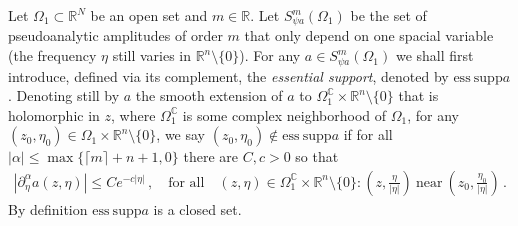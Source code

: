 \documentclass[
	fontsize=11pt, 
	twoside=false, 
	abstract=true, 
	a4paper,
]{scrartcl}
\newcommand{\sem}{\setminus\{0\}}
\newcommand{\RR}{\mathbb{R}}
\newcommand{\CC}{\mathbb{C}}
\newcommand{\abs}[1]{\left\lvert#1\right\rvert}
\newcommand{\del}{\partial}
\newcommand{\es}{\mathrm{ess}\ \mathrm{supp}}
\begin{document}
Let $\Omega_1\subset \RR^N$ be an open set and $m\in\RR$. Let $S^m_{\psi a}(\Omega_1)$ be the set of pseudoanalytic amplitudes of order $m$ that only depend on one spacial variable (the frequency $\eta$ still varies in $\RR^n\sem$). For any $a\in S^m_{\psi a}(\Omega_1)$ we shall first introduce, defined via its complement, the \emph{essential support}, denoted by $\es a$. Denoting still by $a$ the smooth extension of $a$ to $\Omega_1^\CC\times \RR^n\sem$ that is holomorphic in $z$, where $\Omega_1^\CC$ is some complex neighborhood of $\Omega_1$, for any $(z_0,\eta_0)\in \Omega_1\times\RR^n\sem$, we say $(z_0,\eta_0) \not \in \es a$ if for all $\abs{\alpha}\leq \max\{\lceil m\rceil + n + 1,0\}$ there are $C,c>0$ so that
\begin{gather*}
	\abs{\del^\alpha_\eta a(z,\eta)} \leq Ce^{-c\abs{\eta}}\,,\quad\text{for all}\quad (z,\eta)\in \Omega_1^\CC\times\RR^n\sem\colon \left(z,\frac{\eta}{\abs{\eta}}\right)\ \text{near}\ \left(z_0,\frac{\eta_0}{\abs{\eta}}\right)\,.
\end{gather*}
By definition $\es a$ is  a closed set. 

%
\end{document}
